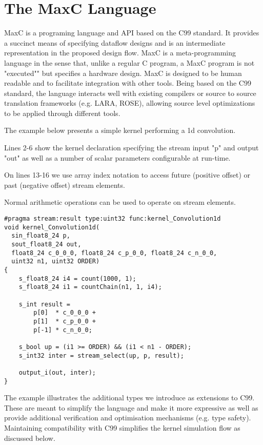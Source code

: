 \section{The  MaxC Language}

MaxC is a programing language and API based on the C99 standard. It
provides a succinct means of specifying dataflow designs and is an
intermediate representation in the proposed design flow. MaxC is a
meta-programming language in the sense that, unlike a regular C
program, a MaxC program is not "executed"" but specifies
a hardware design. MaxC is designed to be human readable and to
facilitate integration with other tools. Being based on the C99
standard, the language interacts well with existing compilers or source
to source translation frameworks (e.g. LARA, ROSE), allowing source
level optimizations to be applied through different tools.

The example below presents a simple kernel performing a 1d
convolution.

Lines 2-6 show the kernel declaration specifying the stream input "p"
and output "out" as well as a number of scalar parameters configurable
at run-time.

On lines 13-16 we use array index notation to access future (positive
offset) or past (negative offset) stream elements.

Normal arithmetic operations can be used to operate on stream
elements.

\lstset{style=MaxC}

\begin{lstlisting}
#pragma stream:result type:uint32 func:kernel_Convolution1d
void kernel_Convolution1d(
  sin_float8_24 p,
  sout_float8_24 out,
  float8_24 c_0_0_0, float8_24 c_p_0_0, float8_24 c_n_0_0,
  uint32 n1, uint32 ORDER)
{
    s_float8_24 i4 = count(1000, 1);
    s_float8_24 i1 = countChain(n1, 1, i4);

    s_int result =
        p[0]  * c_0_0_0 +
        p[1]  * c_p_0_0 +
        p[-1] * c_n_0_0;

    s_bool up = (i1 >= ORDER) && (i1 < n1 - ORDER);
    s_int32 inter = stream_select(up, p, result);

    output_i(out, inter);
}
\end{lstlisting}

The example illustrates the additional types we introduce as
extensions to C99. These are meant to simplify the language and make
it more expressive as well as provide additional verification and
optimisation mechanisms (e.g. type safety). Maintaining compatibility
with C99 simplifies the kernel simulation flow as discussed below.

